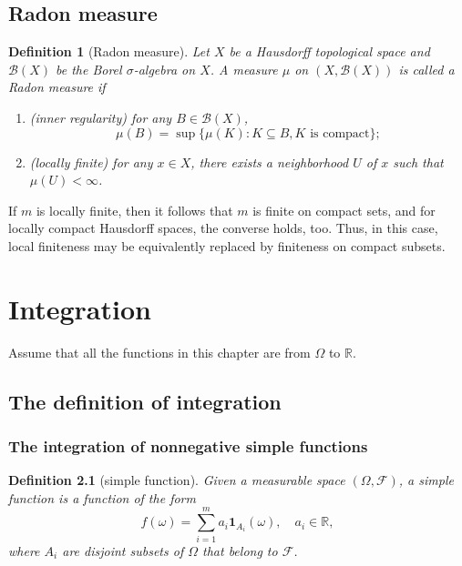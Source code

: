 \documentclass{report}
\newtheorem{definition}{Definition}[section]
\theoremstyle{nonumberplain}
\begin{document}
\section{Radon measure}
\begin{definition}[Radon measure]
	Let $X$ be a Hausdorff topological space and $\mathcal{B}(X)$ be the Borel $\sigma$-algebra on $X$. A measure $\mu$ on $(X,\mathcal{B}(X))$ is called a \emph{Radon measure} if
	\begin{enumerate}[(1)]
		\item (inner regularity) for any $B\in\mathcal{B}(X)$,
		\[
		\mu(B)=\sup\{\mu(K):K\subseteq B,K\text{ is compact}\};
		\]
		\item (locally finite) for any $x\in X$, there exists a neighborhood $U$ of $x$ such that $\mu(U)<\infty$.
	\end{enumerate}
\end{definition}

If $m$ is locally finite, then it follows that $m$ is finite on compact sets, and for locally compact Hausdorff spaces, the converse holds, too. Thus, in this case, local finiteness may be equivalently replaced by finiteness on compact subsets.




\chapter{Integration}
Assume that all the functions in this chapter are from $\Omega$ to $\mathbb{R}$.
\section{The definition of integration}
\subsection{The integration of nonnegative simple functions}
\begin{definition}[simple function]
	Given a measurable space $(\Omega, \mathcal{F})$, a simple function is a function of the form
	\[
	f(\omega)=\sum_{i=1}^ma_i\mathbf{1}_{A_i}(\omega),\quad a_i\in\mathbb{R},
	\]
	where $A_i$ are disjoint subsets
	of $\Omega$ that belong to $\mathcal{F}$.
\end{definition}
\end{document}
